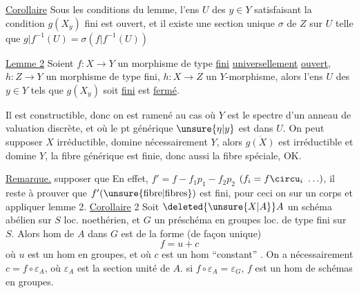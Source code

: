 \uline{Corollaire} Sous les conditions du lemme, l'ens $U$ des $y\in Y$ satisfaisant la condition $g(X_y)$ fini est ouvert, et il existe une section unique
$\sigma$ de $Z$ sur $U$ telle que $g|f^{-1}(U)=\sigma(f|f^{-1}(U))$

\uline{Lemme 2} Soient $f:X\longrightarrow Y$ un morphisme de type \uline{fini} \uline{universellement} \uline{ouvert},  $h:Z\longrightarrow Y$ un morphisme  de type fini, $h:X\longrightarrow Z$ un $Y$-morphisme, alors l'ens $U$ des $y\in Y$ tels que $g(X_y)$ soit \uline{fini} est  \uline{fermé}.

 Il est  constructible, donc on est ramené au cas où $Y$ est le spectre d'un anneau de valuation discrète, et où le pt générique $\unsure{\eta|y}$ est dans $U$. On peut supposer $X$ irréductible,   domine nécessairement $Y$, alors $\overline{g(X)}$ est irréductible et domine $Y$,  la fibre générique est finie, donc aussi la fibre spéciale, OK.


\uline{Remarque.}     supposer que    En effet,  $f'=f-f_1p_1-f_2p_2$ $(f_i=f\circu_i\ \ldots)$, il reste à prouver que $f'(\text{\unsure{fibre|fibres}})$ est fini, pour ceci on  sur un corps et appliquer lemme 2.
\uline{Corollaire} 2 Soit $\deleted{\unsure{X|A}}A$ un schéma abélien sur $S$ loc. noethérien, et $G$ un préschéma en groupes loc. de type fini sur $S$. Alors  hom  de $A$ dans $G$ est de la forme (de façon unique)
\[
f=u+c
\]
où $u$ est un hom en groupes, et où $c$ est un hom ``constant'' . On a nécessairement $c=f\circ\varepsilon_A$, où $\varepsilon_A$ est la section unité de $A$.  si $f\circ\varepsilon_A=\varepsilon_G$, $f$ est un hom de schémas en groupes.

